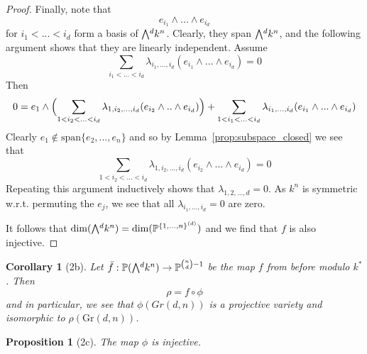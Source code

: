 \documentclass{scrartcl}
\newcommand{\Proj}{\mathbb{P}}
\newcommand{\Gr}{\mathrm{Gr}}
\newcommand{\extpow}{\mathchoice{{\textstyle\bigwedge}}
    {{\bigwedge}}
    {{\textstyle\wedge}}
    {{\scriptstyle\wedge}}}
\newcommand{\vspan}{\mathrm{span}}
\newtheorem{proposition}[definition]{Proposition}
\newtheorem{corollary}[definition]{Corollary}
\begin{document}
\begin{proof}
    Finally, note that
    \begin{equation*}
        e_{i_1} \wedge ... \wedge e_{i_d}
    \end{equation*}
    for $i_1 < ... < i_d$ form a basis of $\extpow^d k^n$.
    Clearly, they span $\extpow^d k^n$, and the following argument shows that they are linearly independent.
    Assume
    \begin{equation*}
        \sum_{i_1 < ... < i_d} \lambda_{i_1, ..., i_d} (e_{i_1} \wedge ... \wedge e_{i_d}) = 0
    \end{equation*}
    Then
    \begin{equation*}
        0 = e_1 \wedge \Bigl( \sum_{1 < i_2 < ... < i_d} \lambda_{1, i_2, ..., i_d} (e_{i_2} \wedge .. \wedge e_{i_d}) \Bigr) + \sum_{1 < i_1 < ... < i_d} \lambda_{i_1, ..., i_d} (e_{i_1} \wedge ... \wedge e_{i_d} )
    \end{equation*}
    Clearly $e_1 \notin \vspan\{e_2, ..., e_n\}$ and so by Lemma~\ref{prop:subspace_closed} we see that
    \begin{equation*}
        \sum_{1 < i_2 < ... < i_d} \lambda_{1, i_2, ..., i_d} (e_{i_2} \wedge ... \wedge e_{i_d}) = 0
    \end{equation*}
    Repeating this argument inductively shows that $\lambda_{1, 2, ..., d} = 0$.
    As $k^n$ is symmetric w.r.t. permuting the $e_j$, we see that all $\lambda_{i_1, ..., i_d} = 0$ are zero.

    It follows that $\dim(\extpow^d k^n) = \dim(\Proj^{\{1, ..., n\}^{(d)}})$ and we find that $f$ is also injective.
\end{proof}
\begin{corollary}[2b]
    Let $\bar{f}: \Proj(\extpow^d k^n) \to \Proj^{{n \choose d} - 1}$ be the map $f$ from before modulo $k^*$.
    Then
    \begin{equation*}
        \rho = f \circ \phi
    \end{equation*}
    and in particular, we see that $\phi(Gr(d, n))$ is a projective variety and isomorphic to $\rho(\Gr(d, n))$.
\end{corollary}
\begin{proposition}[2c]
    The map $\phi$ is injective.
\end{proposition}
\end{document}
